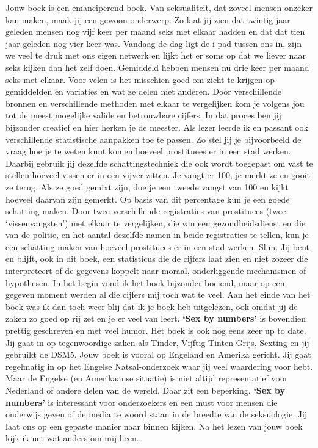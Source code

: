 \documentclass[]{book}
\begin{document}
Jouw boek is een emanciperend boek. Van seksualiteit, dat zoveel mensen
onzeker kan maken, maak jij een gewoon onderwerp. Zo laat jij zien dat
twintig jaar geleden mensen nog vijf keer per maand seks met elkaar
hadden en dat dat tien jaar geleden nog vier keer was. Vandaag de dag
ligt de i-pad tussen ons in, zijn we veel te druk met ons eigen netwerk
en lijkt het er soms op dat we liever naar seks kijken dan het zelf
doen. Gemiddeld hebben mensen nu drie keer per maand seks met elkaar.
Voor velen is het misschien goed om zicht te krijgen op gemiddelden en
variaties en wat ze delen met anderen. Door verschillende bronnen en
verschillende methoden met elkaar te vergelijken kom je volgens jou tot
de meest mogelijke valide en betrouwbare cijfers. In dat proces ben jij
bijzonder creatief en hier herken je de meester. Als lezer leerde ik en
passant ook verschillende statistische aanpakken toe te passen. Zo stel
jij je bijvoorbeeld de vraag hoe je te weten kunt komen hoeveel
prostituees er in een stad werken. Daarbij gebruik jij dezelfde
schattingstechniek die ook wordt toegepast om vast te stellen hoeveel
vissen er in een vijver zitten. Je vangt er 100, je merkt ze en gooit ze
terug. Als ze goed gemixt zijn, doe je een tweede vangst van 100 en
kijkt hoeveel daarvan zijn gemerkt. Op basis van dit percentage kun je
een goede schatting maken. Door twee verschillende registraties van
prostituees (twee `vissenvangsten') met elkaar te vergelijken, die van
een gezondheidsdienst en die van de politie, en het aantal dezelfde
namen in beide registraties te tellen, kun je een schatting maken van
hoeveel prostituees er in een stad werken. Slim. Jij bent en blijft, ook
in dit boek, een statisticus die de cijfers laat zien en niet zozeer die
interpreteert of de gegevens koppelt naar moraal, onderliggende
mechanismen of hypothesen. In het begin vond ik het boek bijzonder
boeiend, maar op een gegeven moment werden al die cijfers mij toch wat
te veel. Aan het einde van het boek was ik dan toch weer blij dat ik je
boek heb uitgelezen, ook omdat jij de zaken zo goed op rij zet en je er
veel van leert. \textbf{`Sex by numbers'} is bovendien prettig
geschreven en met veel humor. Het boek is ook nog eens zeer up to date.
Jij gaat in op tegenwoordige zaken als Tinder, Vijftig Tinten Grijs,
Sexting en jij gebruikt de DSM5. Jouw boek is vooral op Engeland en
Amerika gericht. Jij gaat regelmatig in op het Engelse Natsal-onderzoek
waar jij veel waardering voor hebt. Maar de Engelse (en Amerikaanse
situatie) is niet altijd representatief voor Nederland of andere delen
van de wereld. Daar zit een beperking. \textbf{`Sex by numbers'} is
interessant voor onderzoekers en een must voor mensen die onderwijs
geven of de media te woord staan in de breedte van de seksuologie. Jij
laat ons op een gepaste manier naar binnen kijken. Na het lezen van jouw
boek kijk ik net wat anders om mij heen.
\end{document}
